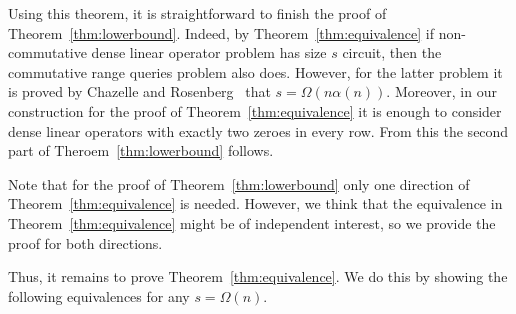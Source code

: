 \documentclass[a4paper,UKenglish,cleveref, autoref]{lipics-v2019}
\begin{document}
Using this theorem, it is straightforward to finish the proof of
Theorem~\ref{thm:lowerbound}.
Indeed, by Theorem~\ref{thm:equivalence} if non-commutative dense linear operator problem has size $s$ circuit, then the commutative range queries problem also does. However, for the latter problem it is proved by Chazelle and Rosenberg~\cite{DBLP:journals/ijcga/ChazelleR91} that $s=\Omega(n \alpha(n))$. Moreover, in our construction for the proof of Theorem~\ref{thm:equivalence} it is enough to consider dense linear operators with exactly two zeroes in every row. From this the second part of Theroem~\ref{thm:lowerbound} follows.

Note that for the proof of Theorem~\ref{thm:lowerbound} only one direction of Theorem~\ref{thm:equivalence} is needed. However, we think that the equivalence in Theorem~\ref{thm:equivalence} might be of independent interest, so we provide the proof for both directions.

Thus, it remains to prove Theorem~\ref{thm:equivalence}. We do this by showing the following equivalences for any $s = \Omega(n)$.

\begin{center}
\end{center}

\end{document}
